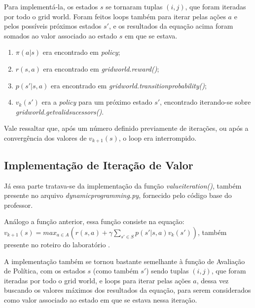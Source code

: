 \documentclass[conference]{IEEEtran}
\begin{document}
Para implementá-la, os estados $s$ se tornaram tuplas $(i, j)$, que foram iteradas por todo o grid world. Foram feitos loops também para iterar pelas ações $a$ e pelos possíveis próximos estados $s'$, e os resultados da equação acima foram somados ao valor associado ao estado $s$ em que se estava. 

\begin{enumerate}
\item $\pi \left ( a|s \right )$ era encontrado em \textit{policy};

\item $r \left ( s, a \right )$ era encontrado em \textit{grid\underline{\space}world.reward()};

\item $p \left ( s' | s, a \right )$ era encontrado em \textit{grid\underline{\space}world.transition\underline{\space}probability()};

\item $v_k \left ( s' \right )$ era a \textit{policy} para um próximo estado $s'$, encontrado iterando-se sobre \textit{grid\underline{\space}world.get\underline{\space}valid\underline{\space}sucessors()}.
\end{enumerate}

Vale ressaltar que, após um número definido previamente de iterações, ou após a convergência dos valores de $v_{k+1}(s)$, o loop era interrompido.

\subsection{Implementação de Iteração de Valor}
Já essa parte tratava-se da implementação da função \textit{value\underline{\space}iteration()}, também presente no arquivo \textit{dynamic\underline{\space}programming.py}, fornecido pelo código base do professor.

Análogo a função anterior, essa função consiste na equação: $v_{k+1}\left ( s \right ) = max_{a \in A} \left (  r \left ( s, a \right ) + \gamma \sum_{s'\in S} p \left ( s' | s, a \right ) v_k \left ( s' \right ) \right )$, também presente no roteiro do laboratório \cite{roteiro}.

A implementação também se tornou bastante semelhante à função de Avaliação de Política, com os estados $s$ (como também $s'$) sendo tuplas $(i, j)$, que foram iteradas por todo o grid world, e loops para iterar pelas ações $a$, dessa vez buscando os valores máximos dos resultados da equação, para serem considerados como valor associado ao estado em que se estava nessa iteração. 
\end{document}

